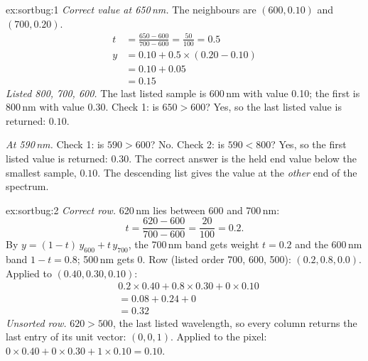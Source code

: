 
\begin{solution}{ex:sortbug:1}
\emph{Correct value at 650\,nm.} The neighbours are $(600, 0.10)$ and $(700, 0.20)$.
\begin{align*}
t &= \frac{650 - 600}{700 - 600} = \frac{50}{100} = 0.5\\
y &= 0.10 + 0.5 \times (0.20 - 0.10)\\
  &= 0.10 + 0.05\\
  &= 0.15
\end{align*}
\emph{Listed 800, 700, 600.} The last listed sample is 600\,nm with value 0.10; the first is 800\,nm with value
0.30. Check 1: is $650 > 600$? Yes, so the last listed value is returned: $0.10$.

\emph{At 590\,nm.} Check 1: is $590 > 600$? No. Check 2: is $590 < 800$? Yes, so the first listed value is
returned: $0.30$. The correct answer is the held end value below the smallest sample, $0.10$. The descending list
gives the value at the \emph{other} end of the spectrum.
\end{solution}

\begin{solution}{ex:sortbug:2}
\emph{Correct row.} 620\,nm lies between 600 and 700\,nm:
\[
t = \frac{620 - 600}{700 - 600} = \frac{20}{100} = 0.2 .
\]
By $y = (1-t)\,y_{600} + t\,y_{700}$, the 700\,nm band gets weight $t = 0.2$ and the 600\,nm band $1 - t = 0.8$;
500\,nm gets 0. Row (listed order 700, 600, 500): $(0.2, 0.8, 0.0)$. Applied to $(0.40, 0.30, 0.10)$:
\begin{align*}
& 0.2 \times 0.40 + 0.8 \times 0.30 + 0 \times 0.10\\
&= 0.08 + 0.24 + 0\\
&= 0.32
\end{align*}
\emph{Unsorted row.} $620 > 500$, the last listed wavelength, so every column returns the last entry of its unit
vector: $(0, 0, 1)$. Applied to the pixel: $0 \times 0.40 + 0 \times 0.30 + 1 \times 0.10 = 0.10$.
\end{solution}

